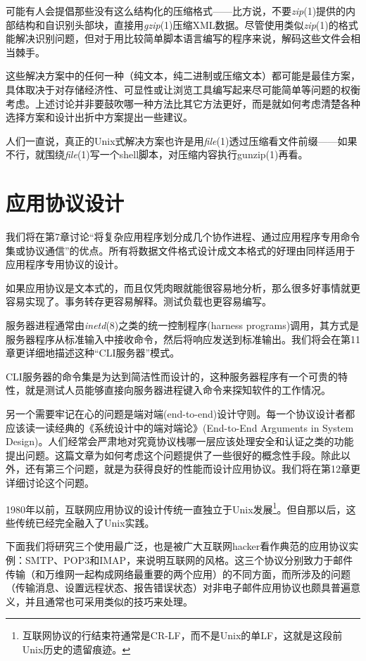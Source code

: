 \documentclass[12pt,oneside]{book}
\begin{document}
可能有人会提倡那些没有这么结构化的压缩格式——比方说，不要\textit{zip}(1)提供的内部结构和自识别头部块，直接用\textit{gzip}(1)压缩XML数据。尽管使用类似\textit{zip}(1)的格式能解决识别问题，但对于用比较简单脚本语言编写的程序来说，解码这些文件会相当棘手。

这些解决方案中的任何一种（纯文本，纯二进制或压缩文本）都可能是最佳方案，具体取决于对存储经济性、可显性或让浏览工具编写起来尽可能简单等问题的权衡考虑。上述讨论并非要鼓吹哪一种方法比其它方法更好，而是就如何考虑清楚各种选择方案和设计出折中方案提出一些建议。

人们一直说，真正的Unix式解决方案也许是用\textit{file}(1)透过压缩看文件前缀——如果不行，就围绕\textit{file}(1)写一个shell脚本，对压缩内容执行gunzip(1)再看。


\section{应用协议设计}
我们将在第7章讨论“将复杂应用程序划分成几个协作进程、通过应用程序专用命令集或协议通信”的优点。所有将数据文件格式设计成文本格式的好理由同样适用于应用程序专用协议的设计。

如果应用协议是文本式的，而且仅凭肉眼就能很容易地分析，那么很多好事情就更容易实现了。事务转存更容易解释。测试负载也更容易编写。

服务器进程通常由\textit{inetd}(8)之类的统一控制程序(harness programs)调用，其方式是服务器程序从标准输入中接收命令，然后将响应发送到标准输出。我们将会在第11章更详细地描述这种“CLI服务器”模式。

CLI服务器的命令集是为达到简洁性而设计的，这种服务器程序有一个可贵的特性，就是测试人员能够直接向服务器进程键入命令来探知软件的工作情况。

另一个需要牢记在心的问题是端对端(end-to-end)设计守则。每一个协议设计者都应该读一读经典的《系统设计中的端对端论》(End-to-End Arguments in System Design)\cite{Saltzer}。人们经常会严肃地对究竟协议栈哪一层应该处理安全和认证之类的功能提出问题。这篇文章为如何考虑这个问题提供了一些很好的概念性手段。除此以外，还有第三个问题，就是为获得良好的性能而设计应用协议。我们将在第12章更详细讨论这个问题。

1980年以前，互联网应用协议的设计传统一直独立于Unix发展\footnote{互联网协议的行结束符通常是CR-LF，而不是Unix的单LF，这就是这段前Unix历史的遗留痕迹。}。但自那以后，这些传统已经完全融入了Unix实践。

下面我们将研究三个使用最广泛，也是被广大互联网hacker看作典范的应用协议实例：SMTP、POP3和IMAP，来说明互联网的风格。这三个协议分别致力于邮件传输（和万维网一起构成网络最重要的两个应用）的不同方面，而所涉及的问题（传输消息、设置远程状态、报告错误状态）对非电子邮件应用协议也颇具普遍意义，并且通常也可采用类似的技巧来处理。
\end{document}
